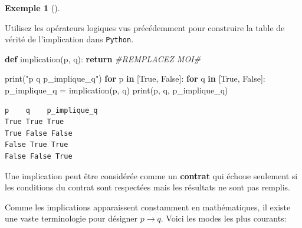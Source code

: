 \documentclass[
  letterpaper,
]{scrbook}
\newenvironment{Shaded}{}{}
\newcommand{\BuiltInTok}[1]{#1}
\newcommand{\CommentTok}[1]{\textcolor[rgb]{0.38,0.63,0.69}{\textit{#1}}}
\newcommand{\ControlFlowTok}[1]{\textcolor[rgb]{0.00,0.44,0.13}{\textbf{#1}}}
\newcommand{\KeywordTok}[1]{\textcolor[rgb]{0.00,0.44,0.13}{\textbf{#1}}}
\newcommand{\NormalTok}[1]{#1}
\newcommand{\OperatorTok}[1]{\textcolor[rgb]{0.40,0.40,0.40}{#1}}
\newcommand{\StringTok}[1]{\textcolor[rgb]{0.25,0.44,0.63}{#1}}
\newcommand{\VariableTok}[1]{\textcolor[rgb]{0.10,0.09,0.49}{#1}}
\theoremstyle{definition}
\newtheorem{example}{Exemple}[chapter]
\theoremstyle{definition}
\theoremstyle{plain}
\theoremstyle{remark}
\begin{document}
\leavevmode{}%
\begin{example}[]\label{exm-implication-python}

Utilisez les opérateurs logiques vus précédemment pour construire la
table de vérité de l'implication dans \texttt{Python}.

\hypertarget{implication-python-todo}{}
\begin{Shaded}
\begin{Highlighting}[]
\KeywordTok{def}\NormalTok{ implication(p, q):}
    \ControlFlowTok{return} \CommentTok{\#REMPLACEZ MOI\#}

\BuiltInTok{print}\NormalTok{(}\StringTok{"p    q    p\_implique\_q"}\NormalTok{)}
\ControlFlowTok{for}\NormalTok{ p }\KeywordTok{in}\NormalTok{ [}\VariableTok{True}\NormalTok{, }\VariableTok{False}\NormalTok{]:}
    \ControlFlowTok{for}\NormalTok{ q }\KeywordTok{in}\NormalTok{ [}\VariableTok{True}\NormalTok{, }\VariableTok{False}\NormalTok{]:}
\NormalTok{        p\_implique\_q }\OperatorTok{=}\NormalTok{ implication(p, q)}
        \BuiltInTok{print}\NormalTok{(p, q, p\_implique\_q)}
\end{Highlighting}
\end{Shaded}

\hypertarget{implication-python}{}
\begin{verbatim}
p    q    p_implique_q
True True True
True False False
False True True
False False True
\end{verbatim}

\end{example}

\begin{tcolorbox}[enhanced jigsaw, colframe=quarto-callout-important-color-frame, bottomtitle=1mm, coltitle=black, breakable, arc=.35mm, title=\textcolor{quarto-callout-important-color}{\faExclamation}\hspace{0.5em}{Important}, opacitybacktitle=0.6, colback=white, opacityback=0, colbacktitle=quarto-callout-important-color!10!white, leftrule=.75mm, rightrule=.15mm, titlerule=0mm, toprule=.15mm, toptitle=1mm, left=2mm, bottomrule=.15mm]

Une implication peut être considérée comme un \textbf{contrat} qui
échoue seulement si les conditions du contrat sont respectées mais les
résultats ne sont pas remplis.

\end{tcolorbox}

Comme les implications apparaissent constamment en mathématiques, il
existe une vaste terminologie pour désigner \(p\rightarrow q\). Voici
les modes les plus courants:
\end{document}
